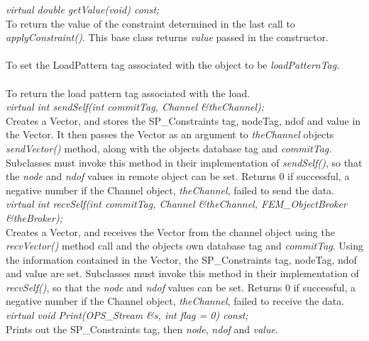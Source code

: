 {\em virtual double getValue(void) const;} \\
To return the value of the constraint determined in the last call to
{\em applyConstraint()}. This base class returns {\em value} passed in
the constructor.  \\ 

\\
To set the LoadPattern tag associated with the object to be {\em
loadPatternTag}. \\

\\ 
To return the load pattern tag associated with the load. \\

{\em virtual int sendSelf(int commitTag, Channel \&theChannel);} \\ 
Creates a Vector, and stores the SP\_Constraints tag, nodeTag, ndof and value in
the Vector. It then passes the Vector as an argument to {\em
theChannel} objects {\em sendVector()} method, along with the objects 
database tag and {\em commitTag}. Subclasses must invoke this method
in their implementation of {\em sendSelf()}, so that the {\em node}
and {\em ndof} values in remote object can be set. Returns $0$ if
successful, a negative number if the Channel object, {\em theChannel},
failed to send the data. \\ 

{\em virtual int recvSelf(int commitTag, Channel \&theChannel, FEM\_ObjectBroker
\&theBroker);} \\ 
Creates a Vector, and receives the Vector from the channel object
using the {\em recvVector()} method call and the objects own database
tag and {\em commitTag}. Using the information contained in the Vector, the 
SP\_Constraints tag, nodeTag, ndof and value are set. Subclasses must
invoke this method in their implementation of {\em recvSelf()}, so
that the {\em node} and {\em ndof} values can be set. Returns $0$ if
successful, a negative number if the Channel object, {\em
theChannel}, failed to receive the data. \\   

{\em virtual void Print(OPS_Stream \&s, int flag = 0) const;} \\
Prints out the SP\_Constraints tag, then {\em node}, {\em ndof} and
{\em value}. 

